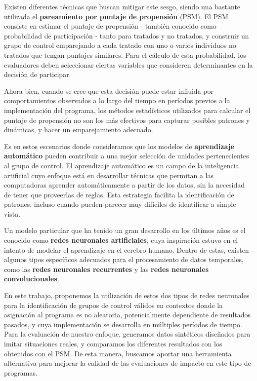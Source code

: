 \documentclass[../main.tex]{subfiles}
\begin{document}
Existen diferentes técnicas que buscan mitigar este sesgo, siendo una bastante utilizada
el \textbf{pareamiento por puntaje de propensión} (PSM).
El PSM consiste en estimar el puntaje de propensión - también conocido como probabilidad de
participación - tanto para tratados y no tratados, y construir un grupo de control
emparejando a cada tratado con uno o varios individuos no tratados que tengan puntajes
similares. Para el cálculo de esta probabilidad, los evaluadores deben seleccionar ciertas
variables que consideren determinantes en la decisión de participar.

Ahora bien, cuando se cree que esta decisión puede estar influida por comportamientos
observados a lo largo del tiempo en períodos previos a la implementación del programa, los
métodos estadísticos utilizados para calcular el puntaje de propensión no son los más
efectivos para capturar posibles patrones y dinámicas, y hacer un emparejamiento adecuado.

Es en estos escenarios donde consideramos que los modelos de \textbf{aprendizaje
automático} pueden contribuir a una mejor selección de unidades pertenecientes al grupo de
control. El aprendizaje automático es un campo de la inteligencia artificial cuyo enfoque
está en desarrollar técnicas que permitan a las computadoras aprender automáticamente a
partir de los datos, sin la necesidad de tener que proveerlas de reglas. Esta estrategia
facilita la identificación de patrones, incluso cuando pueden parecer muy difíciles de
identificar a simple vista.

Un modelo particular que ha tenido un gran desarrollo en los últimos años es el conocido
como \textbf{redes neuronales artificiales}, cuya inspiración estuvo en el intento de
modelar el aprendizaje en el cerebro humano. Dentro de estas, existen algunos tipos
específicos adecuados para el procesamiento de datos temporales, como las \textbf{redes
neuronales recurrentes} y las \textbf{redes neuronales convolucionales}.

En este trabajo, proponemos la utilización de estos dos tipos de redes neuronales para la
identificación de grupos de control válidos en contextos donde la asignación al programa
es no aleatoria, potencialmente dependiente de resultados pasados, y cuya implementación
se desarrolla en múltiples períodos de tiempo. Para la evaluación de nuestro enfoque,
generamos datos sintéticos diseñados para imitar situaciones reales, y comparamos los
diferentes resultados con los obtenidos con el PSM. De esta manera, buscamos aportar una
herramienta alternativa para mejorar la calidad de las evaluaciones de impacto en este
tipo de programas.
\end{document}
